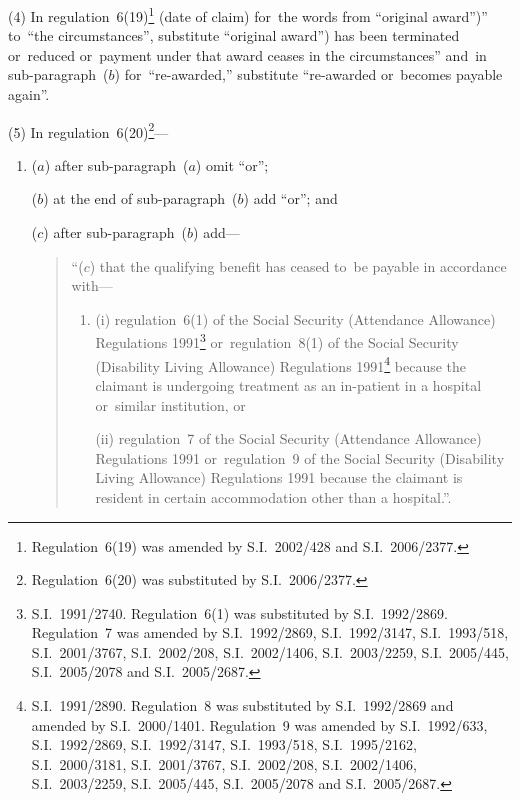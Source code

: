 \documentclass[12pt,a4paper]{article}
\begin{document}
(4) In regulation~6(19)\footnote{Regulation~6(19) was amended by S.I.~2002/428 and S.I.~2006/2377.} (date of claim) for~the words from “original award”)” to~“the circumstances”, substitute “original award”) has been terminated or~reduced or~payment under that award ceases in the circumstances” and~in sub-paragraph~($b$)  for~“re-awarded,” substitute “re-awarded or~becomes payable again”.

(5) In regulation~6(20)\footnote{Regulation~6(20) was substituted by S.I.~2006/2377.}—
\begin{enumerate}\item[]
($a$) after sub-paragraph~($a$)  omit “or”;

($b$) at the end of sub-paragraph~($b$)  add “or”; and

($c$) after sub-paragraph~($b$)  add—
\begin{quotation}
“($c$) that the qualifying benefit has ceased to~be payable in accordance with—
\begin{enumerate}\item[]
(i) regulation~6(1) of the Social Security (Attendance Allowance) Regulations 1991\footnote{S.I.~1991/2740. Regulation~6(1) was substituted by S.I.~1992/2869. Regulation~7 was amended by S.I.~1992/2869, S.I.~1992/3147, S.I.~1993/518, S.I.~2001/3767, S.I.~2002/208, S.I.~2002/1406, S.I.~2003/2259, S.I.~2005/445, S.I.~2005/2078 and S.I.~2005/2687.} or~regulation~8(1) of the Social Security (Disability Living Allowance) Regulations 1991\footnote{S.I.\ 1991/2890. Regulation~8 was substituted by S.I.\ 1992/2869 and amended by S.I.\ 2000/1401. Regulation~9 was amended by S.I.\ 1992/633, S.I.\ 1992/2869, S.I.\ 1992/3147, S.I.\ 1993/518, S.I.\ 1995/2162, S.I.\ 2000/3181, S.I.\ 2001/3767, S.I.\ 2002/208, S.I.\ 2002/1406, S.I.\ 2003/2259, S.I.\ 2005/445, S.I.\ 2005/2078 and S.I.\ 2005/2687.} because the claimant is undergoing treatment as an in-patient in a hospital or~similar institution, or

(ii) regulation~7 of the Social Security (Attendance Allowance) Regulations 1991 or~regulation~9 of the Social Security (Disability Living Allowance) Regulations 1991 because the claimant is resident in certain accommodation other than a hospital.”.
\end{enumerate}
\end{quotation}
\end{enumerate}
\end{document}
